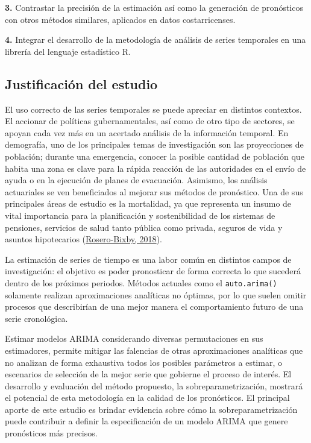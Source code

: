 \documentclass[
]{article}
\begin{document}
\textbf{3.} Contrastar la precisión de la estimación así como la
generación de pronósticos con otros métodos similares, aplicados en
datos costarricenses.

\textbf{4.} Integrar el desarrollo de la metodología de análisis de
series temporales en una librería del lenguaje estadístico R.

\subsection{Justificación del estudio}

El uso correcto de las series temporales se puede apreciar en distintos
contextos. El accionar de políticas gubernamentales, así como de otro
tipo de sectores, se apoyan cada vez más en un acertado análisis de la
información temporal. En demografía, uno de los principales temas de
investigación son las proyecciones de población; durante una emergencia,
conocer la posible cantidad de población que habita una zona es clave
para la rápida reacción de las autoridades en el envío de ayuda o en la
ejecución de planes de evacuación. Asimismo, los análisis actuariales se
ven beneficiados al mejorar sus métodos de pronóstico. Una de sus
principales áreas de estudio es la mortalidad, ya que representa un
insumo de vital importancia para la planificación y sostenibilidad de
los sistemas de pensiones, servicios de salud tanto pública como
privada, seguros de vida y asuntos hipotecarios
(\protect\hyperlink{ref-supenprodc}{Rosero-Bixby, 2018}).

La estimación de series de tiempo es una labor común en distintos campos
de investigación: el objetivo es poder pronosticar de forma correcta lo
que sucederá dentro de los próximos periodos. Métodos actuales como el
\texttt{auto.arima()} solamente realizan aproximaciones analíticas no
óptimas, por lo que suelen omitir procesos que describirían de una mejor
manera el comportamiento futuro de una serie cronológica.

Estimar modelos ARIMA considerando diversas permutaciones en sus
estimadores, permite mitigar las falencias de otras aproximaciones
analíticas que no analizan de forma exhaustiva todos los posibles
parámetros a estimar, o escenarios de selección de la mejor serie que
gobierne el proceso de interés. El desarrollo y evaluación del método
propuesto, la sobreparametrización, mostrará el potencial de esta
metodología en la calidad de los pronósticos. El principal aporte de
este estudio es brindar evidencia sobre cómo la sobreparametrización
puede contribuir a definir la especificación de un modelo ARIMA que
genere pronósticos más precisos.
\end{document}

